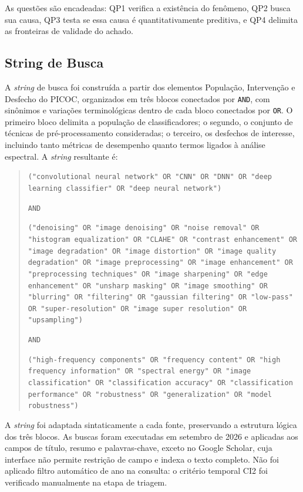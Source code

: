 \documentclass[conference]{IEEEtran}
\begin{document}
As questões são encadeadas: QP1 verifica a existência do fenômeno, QP2 busca
sua causa, QP3 testa se essa causa é quantitativamente preditiva, e QP4
delimita as fronteiras de validade do achado.

\subsection{String de Busca}
\label{sec:sb}

A \textit{string} de busca foi construída a partir dos elementos População,
Intervenção e Desfecho do PICOC, organizados em três blocos conectados por
\texttt{AND}, com sinônimos e variações terminológicas dentro de cada bloco
conectados por \texttt{OR}. O primeiro bloco delimita a população de
classificadores; o segundo, o conjunto de técnicas de pré-processamento
consideradas; o terceiro, os desfechos de interesse, incluindo tanto métricas
de desempenho quanto termos ligados à análise espectral. A \textit{string}
resultante é:

\begin{quote}
\footnotesize
\texttt{("convolutional neural network" OR "CNN" OR "DNN" OR "deep learning
classifier" OR "deep neural network")}

\texttt{AND}

\texttt{("denoising" OR "image denoising" OR "noise removal" OR "histogram
equalization" OR "CLAHE" OR "contrast enhancement" OR "image degradation" OR
"image distortion" OR "image quality degradation" OR "image preprocessing" OR
"image enhancement" OR "preprocessing techniques" OR "image sharpening" OR
"edge enhancement" OR "unsharp masking" OR "image smoothing" OR "blurring" OR
"filtering" OR "gaussian filtering" OR "low-pass" OR "super-resolution" OR
"image super resolution" OR "upsampling")}

\texttt{AND}

\texttt{("high-frequency components" OR "frequency content" OR "high frequency
information" OR "spectral energy" OR "image classification" OR "classification
accuracy" OR "classification performance" OR "robustness" OR "generalization"
OR "model robustness")}
\end{quote}

A \textit{string} foi adaptada sintaticamente a cada fonte, preservando a
estrutura lógica dos três blocos. As buscas foram executadas em setembro de
2026 e aplicadas aos campos de título, resumo e palavras-chave, exceto no
Google Scholar, cuja interface não permite restrição de campo e indexa o texto
completo. Não foi aplicado filtro automático de ano na consulta: o critério
temporal CI2 foi verificado manualmente na etapa de triagem.
\end{document}
